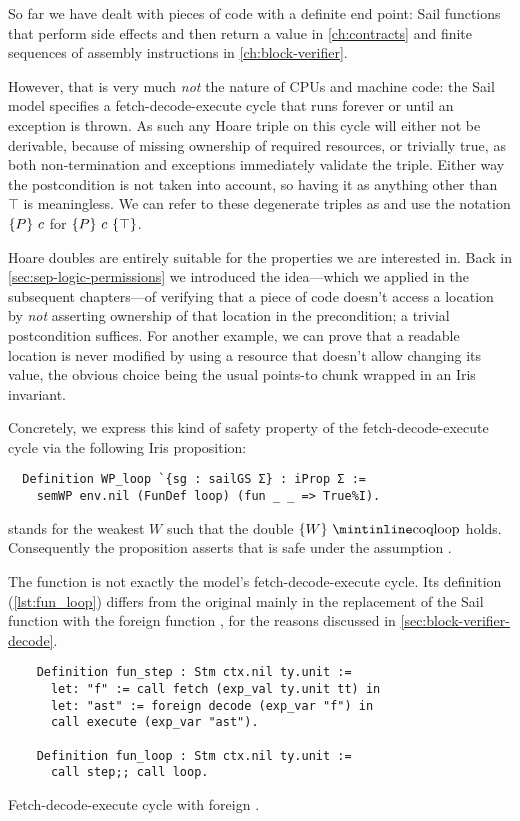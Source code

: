 So far we have dealt with pieces of code with a definite end point: Sail functions that perform side effects and then return a value in \cref{ch:contracts} and finite sequences of assembly instructions in \cref{ch:block-verifier}.

However, that is very much \emph{not} the nature of CPUs and machine code: the Sail model specifies a fetch-decode-execute cycle that runs forever or until an exception is thrown. As such any Hoare triple on this cycle will either not be derivable, \ie because of missing ownership of required resources, or trivially true, as both non-termination and exceptions immediately validate the triple. Either way the postcondition is not taken into account, so having it as anything other than \(\top\) is meaningless. We can refer to these degenerate triples as  and use the notation \(\left\{P\right\}\,c\) for \(\hoare{P}{c}{\top}\).

Hoare doubles are entirely suitable for the properties we are interested in. Back in \cref{sec:sep-logic-permissions} we introduced the idea---which we applied in the subsequent chapters---of verifying that a piece of code doesn't access a location by \emph{not} asserting ownership of that location in the precondition; a trivial postcondition suffices. For another example, we can prove that a readable location is never modified by using a resource that doesn't allow changing its value, the obvious choice being the usual points-to chunk wrapped in an Iris invariant.

Concretely, we express this kind of safety property of the fetch-decode-execute cycle via the following Iris proposition:
\begin{verbatim}
  Definition WP_loop `{sg : sailGS Σ} : iProp Σ :=
    semWP env.nil (FunDef loop) (fun _ _ => True%I).
\end{verbatim}
 stands for the weakest \(W\) such that the double \(\hoared{W}{\text{\coq{loop}}}\) holds. Consequently the proposition  asserts that  is safe under the assumption .

The  function is not exactly the model's fetch-decode-execute cycle. Its definition (\cref{lst:fun_loop}) differs from the original mainly in the replacement of the  Sail function with the foreign function , for the reasons discussed in \cref{sec:block-verifier-decode}.

\begin{listing}[tb]
  \begin{verbatim}
    Definition fun_step : Stm ctx.nil ty.unit :=
      let: "f" := call fetch (exp_val ty.unit tt) in
      let: "ast" := foreign decode (exp_var "f") in
      call execute (exp_var "ast").

    Definition fun_loop : Stm ctx.nil ty.unit :=
      call step;; call loop.
  \end{verbatim}
  \caption{Fetch-decode-execute cycle with foreign .}
  \label{lst:fun_loop}
\end{listing}

